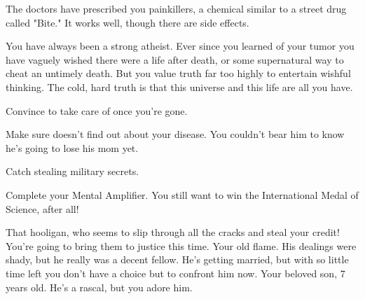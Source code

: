 \documentclass[char]{guildcamp1}
\begin{document}
The doctors have prescribed you painkillers, a chemical similar to a street drug called "Bite." It works well, though there are side effects.

You have always been a strong atheist.  Ever since you learned of your tumor you have vaguely wished there were a life after death, or some supernatural way to cheat an untimely death.  But you value truth far too highly to entertain wishful thinking.  The cold, hard truth is that this universe and this life are all you have.




\begin{itemz}[Goals]
  \item Convince \cGroomA{} to take care of \cKid{} once you're gone.
  \item Make sure \cKid{} doesn't find out about your disease. You couldn't bear him to know he's going to lose his mom yet.
  \item Catch \cRival{} stealing military secrets.
  \item Complete your Mental Amplifier. You still want to win the International Medal of Science, after all!
\end{itemz}

\begin{contacts}
  \contact{\cRival{}} That hooligan, who seems to slip through all the cracks and steal your credit! You're going to bring them to justice this time.
  \contact{\cGroomA{}} Your old flame. His dealings were shady, but he really was a decent fellow. He's getting married, but with so little time left you don't have a choice but to confront him now.
    \contact{\cKid{}} Your beloved son, 7 years old. He's a rascal, but you adore him.
\end{contacts}
\end{document}
